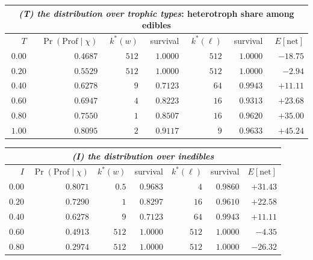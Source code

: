 \documentclass[11pt,a4paper]{article}
\theoremstyle{plain}
\theoremstyle{definition}
\theoremstyle{remark}
\begin{document}
\begin{center}
\begin{tabular}{rrrrrrr}
\multicolumn{7}{c}{\emph{(T) the distribution over trophic types}: heterotroph
share among edibles}\\[3pt]
\toprule
$T$ & $\Pr(\mathrm{Prof}\mid\chi)$ & $k^*(w)$ & survival & $k^*(\ell)$ & survival
& $E[\text{net}]$ \\
\midrule
$0.00$ & $0.4687$ & $512$ & $1.0000$ & $512$ & $1.0000$ & $-18.75$ \\
$0.20$ & $0.5529$ & $512$ & $1.0000$ & $512$ & $1.0000$ & $-2.94$ \\
$0.40$ & $0.6278$ & $9$ & $0.7123$ & $64$ & $0.9943$ & $+11.11$ \\
$0.60$ & $0.6947$ & $4$ & $0.8223$ & $16$ & $0.9313$ & $+23.68$ \\
$0.80$ & $0.7550$ & $1$ & $0.8507$ & $16$ & $0.9620$ & $+35.00$ \\
$1.00$ & $0.8095$ & $2$ & $0.9117$ & $9$ & $0.9633$ & $+45.24$ \\
\bottomrule
\end{tabular}
\end{center}

\begin{center}
\begin{tabular}{rrrrrrr}
\multicolumn{7}{c}{\emph{(I) the distribution over inedibles}}\\[3pt]
\toprule
$I$ & $\Pr(\mathrm{Prof}\mid\chi)$ & $k^*(w)$ & survival & $k^*(\ell)$ & survival
& $E[\text{net}]$ \\
\midrule
$0.00$ & $0.8071$ & $0.5$ & $0.9683$ & $4$ & $0.9860$ & $+31.43$ \\
$0.20$ & $0.7290$ & $1$ & $0.8297$ & $16$ & $0.9610$ & $+22.58$ \\
$0.40$ & $0.6278$ & $9$ & $0.7123$ & $64$ & $0.9943$ & $+11.11$ \\
$0.60$ & $0.4913$ & $512$ & $1.0000$ & $512$ & $1.0000$ & $-4.35$ \\
$0.80$ & $0.2974$ & $512$ & $1.0000$ & $512$ & $1.0000$ & $-26.32$ \\
\bottomrule
\end{tabular}
\end{center}
\end{document}
